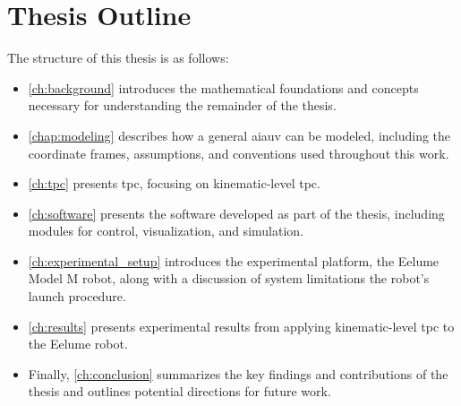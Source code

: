 
\newpage
\section{Thesis Outline}

The structure of this thesis is as follows:

\begin{itemize}
    \item \autoref{ch:background} introduces the mathematical foundations and concepts necessary for understanding the remainder of the thesis.
    \item \autoref{chap:modeling} describes how a general \gls{aiauv} can be modeled, including the coordinate frames, assumptions, and conventions used throughout this work. 
    \item \autoref{ch:tpc} presents \gls{tpc}, focusing on kinematic-level \gls{tpc}.
    \item \autoref{ch:software} presents the software developed as part of the thesis, including modules for control, visualization, and simulation.
    \item \autoref{ch:experimental_setup} introduces the experimental platform, the Eelume Model M robot, along with a discussion of system limitations the robot's launch procedure.
    \item \autoref{ch:results} presents experimental results from applying kinematic-level \gls{tpc} to the Eelume robot.
    \item Finally, \autoref{ch:conclusion} summarizes the key findings and contributions of the thesis and outlines potential directions for future work.
\end{itemize}
